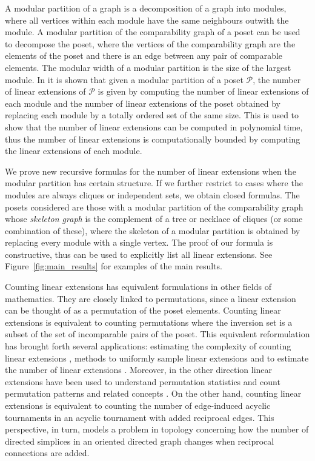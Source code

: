 \documentclass[9pt,a4paper,oneside]{article}
\newcommand{\cP}{\mathcal{P}}
\begin{document}
A modular partition of a graph is a decomposition of a graph into modules, where all vertices within each module have the same neighbours outwith the module. A modular partition of the comparability graph of a poset can be used to decompose the poset, 
where the vertices of the comparability graph are the elements of the poset and there is an edge between any pair of comparable elements. 
The modular width of a modular partition is the size of the largest module.
In \cite{Hab87} it is shown that given a modular partition of a poset $\cP$, the number of linear extensions of $\cP$ is given by computing the number of linear extensions of each module and the number of linear extensions of the poset obtained by replacing each module by a totally ordered set of the same size. 
This is used to show that the number of linear extensions can be computed in polynomial time, thus the number of linear extensions is computationally bounded by computing the linear extensions of each module.

We prove new recursive formulas for the number of linear extensions when the modular partition has certain structure.
If we further restrict to cases where the modules are always cliques or independent sets, we obtain closed formulas.
The posets considered are those with a modular partition of the comparability graph whose \emph{skeleton graph} is the complement of a tree or necklace of cliques (or some combination of these), where the skeleton of a modular partition is obtained by replacing every module with a single vertex.
The proof of our formula is constructive, thus can be used to explicitly list all linear extensions. See Figure~\ref{fig:main_results} for examples of the main results.


Counting linear extensions has equivalent formulations in other fields of mathematics.
They are closely linked to permutations, since a linear extension can be thought of as a permutation of the poset elements.
Counting linear extensions is equivalent to counting permutations where the inversion set is a subset of the set of incomparable pairs of the poset.
This equivalent reformulation has brought forth several applications: estimating the complexity of counting linear extensions \cite{BW91, dittmer2018counting}, methods to uniformly sample linear extensions \cite{PR94,huber2025generating} and to estimate the number of linear extensions \cite{banks2010using}. Moreover, in the other direction linear extensions have been used to understand permutation statistics \cite{BjWa91} and count permutation patterns and related concepts \cite{EN12,yakoubov2015pattern,cooper2016complexity}.
On the other hand, counting linear extensions is equivalent to counting the number of edge-induced acyclic tournaments in an acyclic tournament with added reciprocal edges. This perspective, in turn, models a problem in topology concerning how the number of directed simplices in an oriented directed graph changes when reciprocal connections are added.
\end{document}
